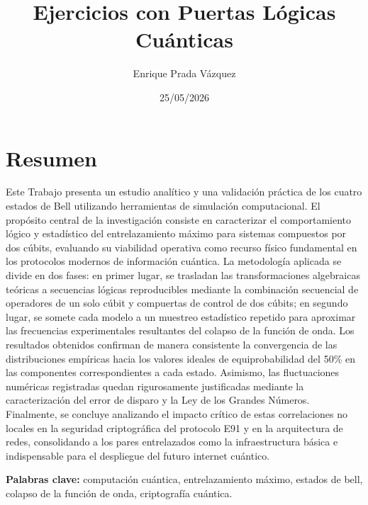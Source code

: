 \documentclass[11pt,a4paper,spanish]{book}
\title{Ejercicios con Puertas Lógicas Cuánticas}
\author{Enrique Prada Vázquez}
\date{25/05/2026}
\begin{document}
\renewcommand{\listfigurename}{Índice de figuras}
\renewcommand{\listtablename}{Índice de tablas}
\renewcommand{\contentsname}{Índice de contenidos}
\renewcommand{\figurename}{Figura}
\renewcommand{\tablename}{Tabla} 

\maketitle
\frontmatter
\tableofcontents

\chapter{Resumen}
Este Trabajo presenta un estudio analítico y una validación práctica de los cuatro estados de Bell utilizando herramientas de simulación computacional. El propósito central de la investigación consiste en caracterizar el comportamiento lógico y estadístico del entrelazamiento máximo para sistemas compuestos por dos cúbits, evaluando su viabilidad operativa como recurso físico fundamental en los protocolos modernos de información cuántica. La metodología aplicada se divide en dos fases: en primer lugar, se trasladan las transformaciones algebraicas teóricas a secuencias lógicas reproducibles mediante la combinación secuencial de operadores de un solo cúbit y compuertas de control de dos cúbits; en segundo lugar, se somete cada modelo a un muestreo estadístico repetido para aproximar las frecuencias experimentales resultantes del colapso de la función de onda. Los resultados obtenidos confirman de manera consistente la convergencia de las distribuciones empíricas hacia los valores ideales de equiprobabilidad del 50\% en las componentes correspondientes a cada estado. Asimismo, las fluctuaciones numéricas registradas quedan rigurosamente justificadas mediante la caracterización del error de disparo y la Ley de los Grandes Números. Finalmente, se concluye analizando el impacto crítico de estas correlaciones no locales en la seguridad criptográfica del protocolo E91 y en la arquitectura de redes, consolidando a los pares entrelazados como la infraestructura básica e indispensable para el despliegue del futuro internet cuántico.

\vspace{0.5cm}
{\bf Palabras clave:} computación cuántica, entrelazamiento máximo, estados de bell, colapso de la función de onda, criptografía cuántica.
\end{document}
